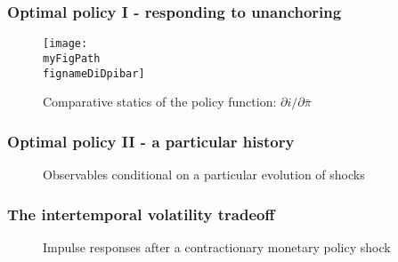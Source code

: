 \documentclass[10pt]{beamer}
\def \myFigPath {../../../figures/}
\def\mySmallFigScale{0.25}
\def\myTinyFigScale{0.16}
\def\fignameDiDpibar{analyze_opt_policy_ip27_Aug_2020}
\def\fignamePEAobsTR{implement_anchTC_obs_TR_approx27_Aug_2020}
\def\fignamePEAobsAnch{implement_anchTC_obs_approx27_Aug_2020_16_21_47}
\def\fignameIRFanchored{command_IFS_anchoring_pretty_RIR_LH_anch_monpol_again_critCUSUM_constant_only_T_400_N_1000_burnin_5_params_psi_pi_1_5_psi_x_0_gbar_0_145_thetbar_16_thettilde_2_5_kap_0_8_lamx_0_lami_0_date_2020_06_05}
\def\fignameIRFunanchored{command_IFS_anchoring_pretty_RIR_LH_unanch_monpol_again_critCUSUM_constant_only_T_400_N_1000_burnin_5_params_psi_pi_1_5_psi_x_0_gbar_0_145_thetbar_16_thettilde_2_5_kap_0_8_lamx_0_lami_0_date_2020_06_05}
\begin{document}

\begin{frame}
	\frametitle{Optimal policy I - responding to unanchoring }
	
\begin{figure}[h!]
\texttt{[image: \\myFigPath \\fignameDiDpibar]}
\caption{Comparative statics of the policy function: $\partial i / \partial \bar{\pi}$}
\end{figure} 

\end{frame}

\begin{frame}
	\frametitle{Optimal policy II - a particular history }
	
\begin{figure}[h!]
{}
\hfill
{}
\caption{Observables conditional on a particular evolution of shocks} 
\end{figure}

\end{frame}

\begin{frame}
	\frametitle{The intertemporal volatility tradeoff}

\begin{figure}[h!]
\caption{Impulse responses after a contractionary monetary policy shock}
\label{IRF}
\end{figure}	

\end{frame}
\end{document}
